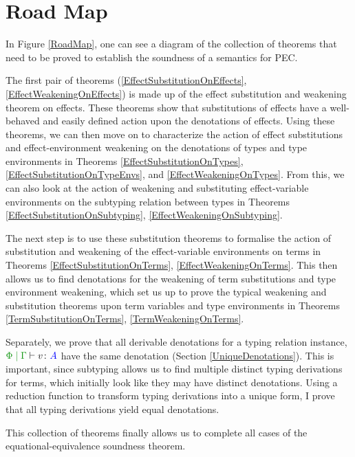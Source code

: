 \documentclass{Report}
\begin{document}
\section{Road Map}
In Figure \ref{RoadMap}, one can see a diagram of the collection of theorems that need to be proved to establish the soundness of a semantics for PEC.


The first pair of theorems (\ref{EffectSubstitutionOnEffects}, \ref{EffectWeakeningOnEffects}) is made up of the effect substitution and weakening theorem on effects. These theorems show that substitutions of effects have a well-behaved and easily defined action upon the denotations of effects. Using these theorems, we can then move on to characterize the action of effect substitutions and effect-environment weakening on the denotations of types and type environments in Theorems \ref{EffectSubstitutionOnTypes}, \ref{EffectSubstitutionOnTypeEnvs}, and \ref{EffectWeakeningOnTypes}. From this, we can also look at the action of weakening and substituting effect-variable environments on the subtyping relation between types in Theorems \ref{EffectSubstitutionOnSubtyping}, \ref{EffectWeakeningOnSubtyping}.

The next step is to use these substitution theorems to formalise the action of substitution and weakening of the effect-variable environments on terms in Theorems \ref{EffectSubstitutionOnTerms}, \ref{EffectWeakeningOnTerms}. This then allows us to find denotations for the weakening of term substitutions and type environment weakening, which set us up to prove the typical weakening and substitution theorems upon term variables and type environments in Theorems \ref{TermSubstitutionOnTerms}, \ref{TermWeakeningOnTerms}. 

Separately, we prove that all derivable denotations for a typing relation instance, $\gpetyperelation{v}{A}$ have the same denotation (Section \ref{UniqueDenotations}). This is important, since subtyping allows us to find multiple distinct typing derivations for terms, which initially look like they may have distinct denotations. Using a reduction function to transform typing derivations into a unique form, I prove that all typing derivations yield equal denotations.

This collection of theorems finally allows us to complete all cases of the equational-equivalence soundness theorem.
\end{document}

